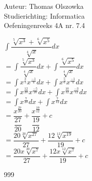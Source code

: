 \documentclass[a4paper]{article}
\newcommand{\dint}{\displaystyle\int}
\newcommand{\fourthroot}{\sqrt[4]}
\newcommand{\fifthroot}{\sqrt[5]}
\newcommand{\sixthroot}{\sqrt[6]}
\newcommand{\twelfthroot}{\sqrt[12]}
\newcommand{\twentiethroot}{\sqrt[20]}
\begin{document}
\noindent \large Auteur: Thomas Olszowka \\
\noindent \large Studierichting: Informatica \\
\noindent \large Oefeningenreeks 4A nr. 7.4  \\



\medskip

\normalsize

$\dint \dfrac{\fifthroot{x^3} + \sixthroot{x^5}}{\fourthroot{x}} dx$ \\

$= \dint \dfrac{\fifthroot{x^3}}{\fourthroot{x}} dx + \dint \dfrac{\sixthroot{x^5}}{\fourthroot{x}} dx$ \\

$= \dint x^{\tfrac{3}{5}} x^{\tfrac{-1}{4}} dx +\dint x^{\tfrac{5}{6}} x^{\tfrac{-1}{4}} dx$ \\

$= \dint x^{\tfrac{12}{20}} x^{\tfrac{-5}{20}} dx +\dint x^{\tfrac{10}{12}} x^{\tfrac{-3}{12}} dx$ \\

$= \dint x^{\tfrac{7}{20}} dx + \dint x^{\tfrac{7}{12}} dx$ \\

$= \dfrac{x^{\tfrac{27}{20}}}{\dfrac{27}{20}} + \dfrac{x^{\tfrac{19}{12}}}{\dfrac{19}{12}} + c$ \\

$= \dfrac{20 \twentiethroot{x^{27}}}{27} + \dfrac{12 \twelfthroot{x^{19}}}{19} +c$ \\

$= \dfrac{20x \twentiethroot{x^{7}}}{27} + \dfrac{12x \twelfthroot{x^{7}}}{19} +c$ \\


\begin{thebibliography}{999}
\end{thebibliography}
\end{document}
